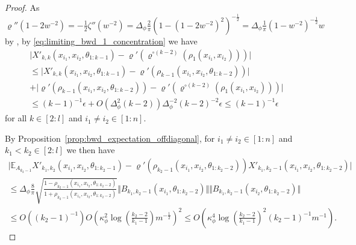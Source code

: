 \documentclass[twoside,11pt]{article}
\newcommand{\E}{\mathbb{E}}
\begin{document}
\begin{proof}
As $\varrho''(1-2w^{-2}) = -\frac{1}{2} \zeta''(w^{-2}) = \Delta_\phi \frac{2}{\pi} (1-(1-2w^{-2})^2)^{-\frac{1}{2}} = \Delta_\phi \frac{1}{\pi} (1-w^{-2})^{-\frac{1}{2}} w$ by \citet[Proposition~11]{mlpsateoc1}, by \eqref{eq:limiting_bwd_1_concentration} we have 
\begin{multline*}
\vert X'_{k,k}(x_{i_1},x_{i_2},\theta_{1:k-1}) - \varrho'(\varrho^{\circ (k-2)}(\rho_1(x_{i_1},x_{i_2}))) \vert \\
\leq \vert X'_{k,k}(x_{i_1},x_{i_2},\theta_{1:k-1}) - \varrho'(\rho_{k-1}(x_{i_1},x_{i_2},\theta_{1:k-2})) \vert \\
+ \vert \varrho'(\rho_{k-1}(x_{i_1},x_{i_2},\theta_{1:k-2})) - \varrho'(\varrho^{\circ (k-2)}(\rho_1(x_{i_1},x_{i_2}))) \vert \\
\leq (k-1)^{-1} \epsilon + O(\Delta_\phi^2 (k-2)) \Delta_\phi^{-2} (k-2)^{-2} \epsilon 
\leq (k-1)^{-1} \epsilon
\end{multline*}
for all $k \in [2:l]$ and $i_1 \neq i_2 \in [1:n]$.

By Proposition~\ref{prop:bwd_expectation_offdiagonal}, for $i_1 \neq i_2 \in [1:n]$ and $k_1 < k_2 \in [2:l]$ we then have
\begin{multline*}
\vert \E_{A_{k_2-1}} X'_{k_1,k_2}(x_{i_1},x_{i_2},\theta_{1:k_2-1}) - \varrho'(\rho_{k_2-1}(x_{i_1},x_{i_2},\theta_{1:k_2-2})) X'_{k_1,k_2-1}(x_{i_1},x_{i_2},\theta_{1:k_2-2}) \vert \\
\leq \Delta_\phi \frac{8}{\pi} \sqrt{\frac{1-\rho_{k_2-1}(x_{i_1},x_{i_2},\theta_{1:k_2-2})}{1+\rho_{k_2-1}(x_{i_1},x_{i_2},\theta_{1:k_2-2})}} \Vert B_{k_1,k_2-1}(x_{i_1},\theta_{1:k_2-2}) \Vert \Vert B_{k_1,k_2-1}(x_{i_2},\theta_{1:k_2-2}) \Vert \\
\leq O((k_2-1)^{-1}) O\left( \kappa_\phi^2 \log\left( \frac{k_2-2}{k_1-1} \right) m^{-\frac{1}{2}} \right)^2
\leq O\left( \kappa_\phi^4 \log\left( \frac{k_2-2}{k_1-1} \right)^2 (k_2-1)^{-1} m^{-1} \right).
\end{multline*}


\end{proof}
\end{document}
